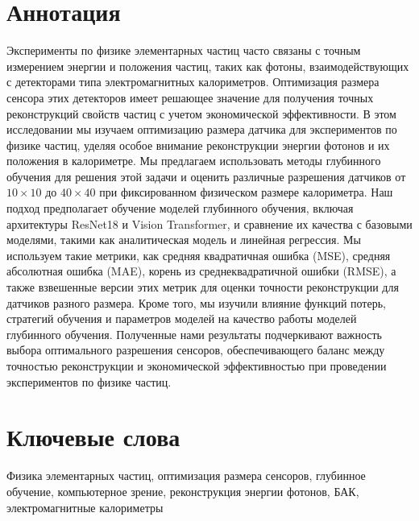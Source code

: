 \documentclass[a4paper,12pt]{extarticle}
\begin{document}
\newpage
\setcounter{page}{2}

{
	\hypersetup{linkcolor=black}
	\tableofcontents
}

\newpage

\newpage

\section*{Аннотация}   %
Эксперименты по физике элементарных частиц часто связаны с точным измерением энергии и положения частиц, таких как фотоны, взаимодействующих с детекторами типа электромагнитных калориметров. Оптимизация размера сенсора этих детекторов имеет решающее значение для получения точных реконструкций свойств частиц с учетом экономической эффективности. В этом исследовании мы изучаем оптимизацию размера датчика для экспериментов по физике частиц, уделяя особое внимание реконструкции энергии фотонов и их положения в калориметре. Мы предлагаем использовать методы глубинного обучения для решения этой задачи и оценить различные разрешения датчиков от $10 \times 10$ до $40 \times 40$ при фиксированном физическом размере калориметра. Наш подход предполагает обучение моделей глубинного обучения, включая архитектуры ResNet18 и Vision Transformer, и сравнение их качества с базовыми моделями, такими как аналитическая модель и линейная регрессия. Мы используем такие метрики, как средняя квадратичная ошибка (MSE), средняя абсолютная ошибка (MAE), корень из среднеквадратичной ошибки (RMSE), а также взвешенные версии этих метрик для оценки точности реконструкции для датчиков разного размера. Кроме того, мы изучили влияние функций потерь, стратегий обучения и параметров моделей на качество работы моделей глубинного обучения. Полученные нами результаты подчеркивают важность выбора оптимального разрешения сенсоров, обеспечивающего баланс между точностью реконструкции и экономической эффективностью при проведении экспериментов по физике частиц.


\section*{Ключевые слова}
Физика элементарных частиц, оптимизация размера сенсоров, глубинное обучение, компьютерное зрение, реконструкция энергии фотонов, БАК, электромагнитные калориметры
\end{document}
